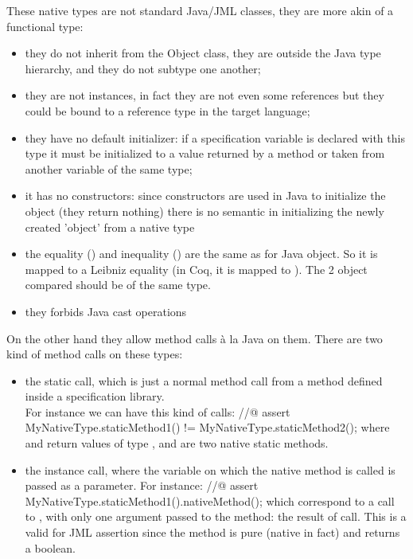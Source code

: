 These native types are not standard Java/JML classes, they are more akin of a functional type:
\begin{itemize}
\item they do not inherit from the Object class, 
they are outside the Java type hierarchy, and they do not
subtype one another;
\item they are not instances, in fact they are not even some references but 
they could be bound to a reference type in the target language;
\item they have no default initializer: 
if a specification variable is declared with this type it must
be initialized to a value returned by a method or taken from 
another variable of the same type;
\item it has no constructors: since constructors are used in Java to 
initialize the object (they return nothing) there is no semantic in 
initializing the newly created 'object' from a native type
\item the equality (\code{==}) and inequality (\code{!=}) are the
same as for Java object. So it is mapped to a Leibniz
equality (in Coq, it is mapped to ). The 2 object compared
should be of the same type.
\item they forbids Java cast operations
\end{itemize}
On the other hand they allow method calls \`a la Java on them. 
There are two kind of method calls on these types:
\begin {itemize}
\item the static call, which is just a normal method call from a 
method defined inside a specification library.\\
For instance we can have this kind of calls:
\btab
//@ assert MyNativeType.staticMethod1() != MyNativeType.staticMethod2();
\etab
where  and   return  values of type , 
and are two native static methods.
\item the instance call, where the variable on which the native method is called is passed as a 
parameter. For instance:
\btab
//@ assert MyNativeType.staticMethod1().nativeMethod();
\etab
which correspond to a call to , with only one argument passed to the method: the
result of  call. This is a valid for JML assertion since the method 
 is
pure (native in fact) and returns a boolean.
\end{itemize}

